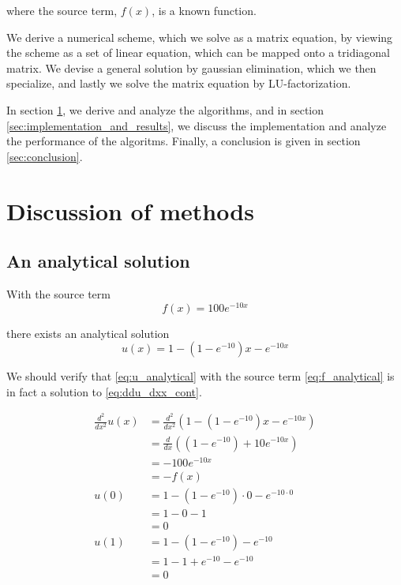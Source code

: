 \documentclass[a4paper]{article}
\begin{document}
where the source term, $f(x)$, is a known function.

We derive a numerical scheme, which we solve as a matrix equation, by viewing the scheme as a set of linear equation, which can be mapped onto a tridiagonal matrix. We devise a general solution by gaussian elimination, which we then specialize, and lastly we solve the matrix equation by LU-factorization.

In section \ref{sec:methods}, we derive and analyze the algorithms, and in section \ref{sec:implementation_and_results}, we discuss the implementation and analyze the performance of the algoritms. Finally, a conclusion is given in section \ref{sec:conclusion}.

\section{Discussion of methods}\label{sec:methods}
\subsection{An analytical solution}

With the source term
\begin{equation}
    f(x) = 100e^{-10x}
    \label{eq:f_analytical}
\end{equation}

there exists an analytical solution
\begin{equation}
    u(x) = 1-(1-e^{-10})x-e^{-10x}
    \label{eq:u_analytical}
\end{equation}

We should verify that \eqref{eq:u_analytical} with the source term \eqref{eq:f_analytical} is in fact a solution to \eqref{eq:ddu_dxx_cont}.

\begin{align*}
    \frac{d^2}{dx^2}  u(x)
    &= \frac{d^2}{dx^2} \left( 1-(1-e^{-10})x-e^{-10x} \right) \\
    &= \frac{d}{dx} \left( (1-e^{-10})+10e^{-10x} \right) \\
    &= -100e^{-10x} \\
    &= -f(x) \\
    u(0)
    &= 1-(1-e^{-10})\cdot 0-e^{-10 \cdot 0} \\
    &= 1-0-1 \\
    &= 0 \\
    u(1)
    &= 1 - (1-e^{-10}) - e^{-10} \\
    &= 1 - 1 + e^{-10} - e^{-10} \\
    &= 0
\end{align*}
\end{document}
